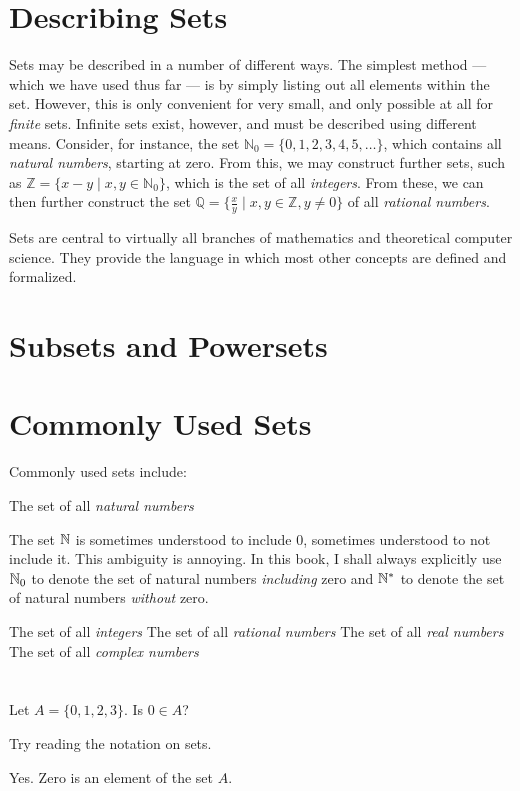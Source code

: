 \section{Describing Sets}
Sets may be described in a number of different ways.
The simplest method --- which we have used thus far --- is by simply listing out
all elements within the set.
However, this is only convenient for very small, and only possible at all for
\emph{finite} sets.
Infinite sets exist, however, and must be described using different means.
Consider, for instance, the set \(\mathbb{N}_{0} = \{0,1,2,3,4,5,\dots\}\),
which contains all \emph{natural numbers}, starting at zero.
From this, we may construct further sets, such as
\(\mathbb{Z} = \{x-y \mid x, y \in \mathbb{N}_0\}\), which is the set of all
\emph{integers}.
From these, we can then further construct the set
\(\mathbb{Q} = \{\frac{x}{y} \mid x,y \in \mathbb{Z}, y \neq 0\}\) of all
\emph{rational numbers}.

Sets are central to virtually all branches of mathematics and theoretical
computer science. They provide the language in which most other concepts are
defined and formalized.

\section{Subsets and Powersets}

\section{Commonly Used Sets}
Commonly used sets include:
\begin{itemize}
   The set of all \emph{natural numbers}
\begin{remark}
  The set \(\mathbb{N}\) is sometimes understood to include \(0\), sometimes understood
  to not include it. This ambiguity is annoying.
  In this book, I shall always explicitly use \(\mathbb{N}_{0}\) to denote the set of
  natural numbers \emph{including} zero and \(\mathbb{N}^{*}\) to denote the set of
  natural numbers \emph{without} zero.
\end{remark}
   The set of all \emph{integers}
   The set of all \emph{rational numbers}
   The set of all \emph{real numbers}
   The set of all \emph{complex numbers}
\end{itemize}

\section{\problemhead}
\begin{problem}
  Let \(A=\{0,1,2,3\}\). Is \(0 \in A\)?
  \begin{hint}
    Try reading the notation on sets.
  \end{hint}
  \begin{sol}
    Yes. Zero is an element of the set \(A\).
  \end{sol}
\end{problem}
